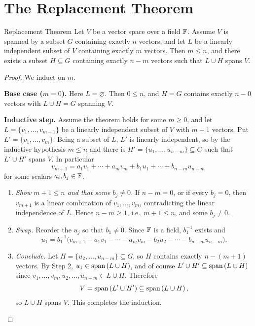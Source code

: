 \documentclass{exam}
\begin{document}
\section{The Replacement Theorem}

\begin{thm}{Replacement Theorem}
  Let $V$ be a vector space over a field $\mathbb F$. Assume $V$ is spanned by a subset $G$ containing exactly $n$ vectors, and let $L$ be a linearly independent subset of $V$ containing exactly $m$ vectors. Then $m \le n$, and there exists a subset $H \subseteq G$ containing exactly $n - m$ vectors such that $L \cup H$ spans $V$.
\end{thm}

\begin{proof}
  We induct on $m$.

  \textbf{Base case ($m = 0$).} Here $L = \varnothing$. Then $0 \le n$, and $H = G$ contains exactly $n - 0$ vectors with $L \cup H = G$ spanning $V$.

  \textbf{Inductive step.} Assume the theorem holds for some $m \ge 0$, and let $L = \{v_1, \dots, v_{m+1}\}$ be a linearly independent subset of $V$ with $m + 1$ vectors. Put $L' = \{v_1, \dots, v_m\}$. Being a subset of $L$, $L'$ is linearly independent, so by the inductive hypothesis $m \le n$ and there is $H' = \{u_1, \dots, u_{n-m}\} \subseteq G$ such that $L' \cup H'$ spans $V$. In particular
  \[
    v_{m+1} = a_1 v_1 + \cdots + a_m v_m + b_1 u_1 + \cdots + b_{n-m} u_{n-m}
  \]
  for some scalars $a_i, b_j \in \mathbb F$.
  \begin{enumerate}[label=\textbf{Step \arabic*.}, leftmargin=*]
    \item \emph{Show $m + 1 \le n$ and that some $b_j \neq 0$.} If $n - m = 0$, or if every $b_j = 0$, then $v_{m+1}$ is a linear combination of $v_1, \dots, v_m$, contradicting the linear independence of $L$. Hence $n - m \ge 1$, i.e.\ $m + 1 \le n$, and some $b_j \neq 0$.
    \item \emph{Swap.} Reorder the $u_j$ so that $b_1 \neq 0$. Since $\mathbb F$ is a field, $b_1^{-1}$ exists and
      \[
        u_1 = b_1^{-1}\bigl(v_{m+1} - a_1 v_1 - \cdots - a_m v_m - b_2 u_2 - \cdots - b_{n-m} u_{n-m}\bigr).
      \]
    \item \emph{Conclude.} Let $H = \{u_2, \dots, u_{n-m}\} \subseteq G$, so $H$ contains exactly $n - (m+1)$ vectors. By Step 2, $u_1 \in \text{span}\left({L \cup H}\right)$, and of course $L' \cup H' \subseteq \text{span}\left({L \cup H}\right)$ since $v_1, \dots, v_m, u_2, \dots, u_{n-m} \in L \cup H$. Therefore
      \[
        V = \text{span}\left({L' \cup H'}\right) \subseteq \text{span}\left({L \cup H}\right),
      \]
      so $L \cup H$ spans $V$. This completes the induction. \qedhere
  \end{enumerate}
\end{proof}
\end{document}
